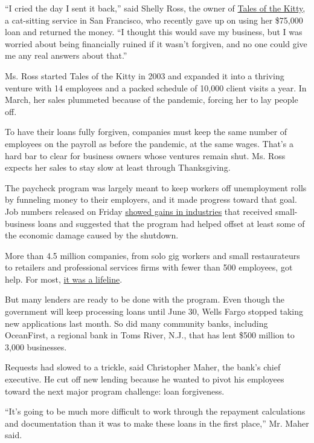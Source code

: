 ``I cried the day I sent it back,'' said Shelly Ross, the owner of
\href{https://talesofthekitty.com/}{Tales of the Kitty}, a cat-sitting
service in San Francisco, who recently gave up on using her \$75,000
loan and returned the money. ``I thought this would save my business,
but I was worried about being financially ruined if it wasn't forgiven,
and no one could give me any real answers about that.''

Ms. Ross started Tales of the Kitty in 2003 and expanded it into a
thriving venture with 14 employees and a packed schedule of 10,000
client visits a year. In March, her sales plummeted because of the
pandemic, forcing her to lay people off.

To have their loans fully forgiven, companies must keep the same number
of employees on the payroll as before the pandemic, at the same wages.
That's a hard bar to clear for business owners whose ventures remain
shut. Ms. Ross expects her sales to stay slow at least through
Thanksgiving.

The paycheck program was largely meant to keep workers off unemployment
rolls by funneling money to their employers, and it made progress toward
that goal. Job numbers released on Friday
\href{https://www.nytimes3xbfgragh.onion/2020/06/05/business/economy/jobs-report.html}{showed
gains in industries} that received small-business loans and suggested
that the program had helped offset at least some of the economic damage
caused by the shutdown.

More than 4.5 million companies, from solo gig workers and small
restaurateurs to retailers and professional services firms with fewer
than 500 employees, got help. For most,
\href{https://www.nytimes3xbfgragh.onion/2020/05/31/business/virus-ppp-loan-small-businesses.html}{it
was a lifeline}.

But many lenders are ready to be done with the program. Even though the
government will keep processing loans until June 30, Wells Fargo stopped
taking new applications last month. So did many community banks,
including OceanFirst, a regional bank in Toms River, N.J., that has lent
\$500 million to 3,000 businesses.

Requests had slowed to a trickle, said Christopher Maher, the bank's
chief executive. He cut off new lending because he wanted to pivot his
employees toward the next major program challenge: loan forgiveness.

``It's going to be much more difficult to work through the repayment
calculations and documentation than it was to make these loans in the
first place,'' Mr. Maher said.

